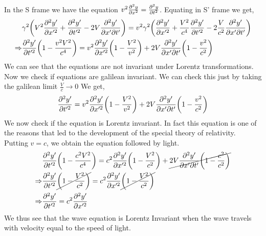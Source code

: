 \documentclass[addpoints]{exam}
\begin{document}
\begin{questions}
\begin{solution}
\begin{align*}
    \end{align*}
    In the S frame we have the equation $v^2\pdv[2]{y}{x} = \pdv[2]{y}{t}$. Equating in S' frame
    we get,
    \begin{align*}
        &\gamma^2\qty(V^2\frac{\partial^2 y'}{\partial x'^2}+\frac{\partial^2 y'}{\partial t'^2}-2V\pdv[2]{y'}{x'}{t'})=v^2\gamma^2\qty(\frac{\partial^2 y'}{\partial x'^2}+\frac{V^2}{c^4}\frac{\partial^2 y'}{\partial t'^2}-2\frac{V}{c^2}\pdv[2]{y'}{x'}{t'})\\
    \Rightarrow& \frac{\partial^2 y'}{\partial t'^2}\qty(1-\frac{v^2V^2}{c^4}) =v^2\frac{\partial^2 y'}{\partial x'^2}\qty(1-\frac{V^2}{v^2})+2V\pdv[2]{y'}{x'}{t'}\qty(1-\frac{v^2}{c^2})
    \end{align*}
    We can see that the equations are not invariant under Lorentz transformations. Now we check if 
    equations are galilean invariant. We can check this just by taking the galilean limit $\frac{V}{c}\rightarrow0$
    We get,
    \begin{align*}
        \frac{\partial^2 y'}{\partial t'^2}=v^2\frac{\partial^2 y'}{\partial x'^2}\qty(1-\frac{V^2}{v^2})+2V\pdv[2]{y'}{x'}{t'}\qty(1-\frac{v^2}{c^2})
    \end{align*}
    We now check if the equation is Lorentz invariant. In fact this equation is one of the reasons that 
    led to the development of the special theory of relativity. Putting $v=c$, we obtain the 
    equation followed by light.
    \begin{align*}
        &\frac{\partial^2 y'}{\partial t'^2}\qty(1-\frac{c^2V^2}{c^4}) =c^2\frac{\partial^2 y'}{\partial x'^2}\qty(1-\frac{V^2}{c^2})+\cancel{2V\pdv[2]{y'}{x'}{t'}\qty(1-\frac{c^2}{c^2})}\\
        \Rightarrow&\frac{\partial^2 y'}{\partial t'^2}\cancel{\qty(1-\frac{V^2}{c^2})} =c^2\frac{\partial^2 y'}{\partial x'^2}\cancel{\qty(1-\frac{V^2}{c^2})}\\
        \Rightarrow&\frac{\partial^2 y'}{\partial t'^2} =c^2\frac{\partial^2 y'}{\partial x'^2}
    \end{align*}
    We thus see that the wave equation is Lorentz Invariant when the wave travels with velocity 
    equal to the speed of light.
\end{solution}


\end{questions}
\end{document}
